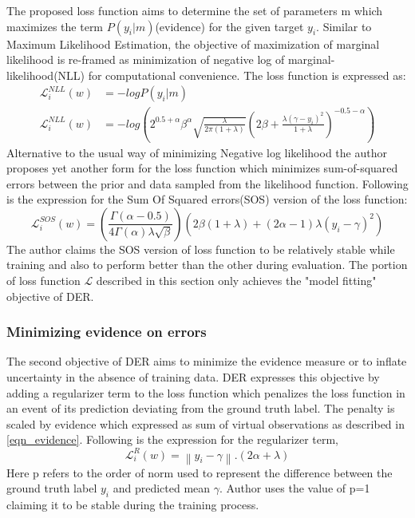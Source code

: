 	The proposed loss function aims to determine the set of parameters m which maximizes the term $P(y_i|m)$(evidence) for the given target $y_i$. Similar to Maximum Likelihood Estimation, the objective of maximization of marginal likelihood is re-framed as minimization of negative log of marginal-likelihood(NLL) for computational convenience.
	The loss function is expressed as:
	\begin{align}
		\mathcal{L}_i^{NLL}(w)&=-logP(y_i|m)\\
		\mathcal{L}_i^{NLL}(w)&= -log(2^{0.5+\alpha}\beta^\alpha\sqrt{\frac{\lambda}{2\pi(1+\lambda)}}(2\beta+\frac{\lambda(\gamma-y_i)^2}{1+\lambda})^{-0.5-\alpha})
	\end{align}
	Alternative to the usual way of minimizing Negative log likelihood the author proposes yet another form for the loss function which minimizes sum-of-squared errors between the prior and data sampled from the likelihood function. Following is the expression for the Sum Of Squared errors(SOS) version of the loss function:
	\begin{equation}
		\mathcal{L}_i^{SOS}(w)=(\frac{\Gamma(\alpha-0.5)}{4\Gamma(\alpha)\lambda\sqrt{\beta}})(2\beta(1+\lambda)+(2\alpha-1)\lambda(y_i-\gamma)^2)
	\end{equation}
	The author claims the SOS version of loss function to be relatively stable while training and also to perform better than the other during evaluation. The portion of loss function $\mathcal{L}$ described in this section only achieves the "model fitting" objective of DER. 
	
	\subsubsection{Minimizing evidence on errors}
	The second objective of DER aims to minimize the evidence measure or to inflate uncertainty in the absence of training data. DER expresses this objective by adding a regularizer term to the loss function which penalizes the loss function in an event of its prediction deviating from the ground truth label. The penalty is scaled by evidence which expressed as sum of virtual observations as described in \ref{eqn_evidence}. Following is the expression for the regularizer term,
	\begin{equation}
		\mathcal{L}_{i}^R(w) = \left\| {y_i - \gamma}\right\|.(2\alpha+\lambda)
	\end{equation}
	Here p refers to the order of norm used to represent the difference between the ground truth label $y_i$ and predicted mean $\gamma$. Author uses the value of p=1 claiming it to be stable during the training process.
	
